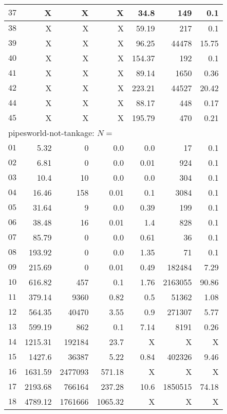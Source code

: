 \begin{longtable}{|c||r|r|r||r|r|r|}
$37$ &  X &  X &  X & 34.8 & 149 & 0.1 \\\hline
$38$ &  X &  X &  X & 59.19 & 217 & 0.1 \\\hline
$39$ &  X &  X &  X & 96.25 & 44478 & 15.75 \\\hline
$40$ &  X &  X &  X & 154.37 & 192 & 0.1 \\\hline
$41$ &  X &  X &  X & 89.14 & 1650 & 0.36 \\\hline
$42$ &  X &  X &  X & 223.21 & 44527 & 20.42 \\\hline
$44$ &  X &  X &  X & 88.17 & 448 & 0.17 \\\hline
$45$ &  X &  X &  X & 195.79 & 470 & 0.21 \\\hline

\multicolumn{7}{|l|}{pipesworld-not-tankage: $N=$}\\\hline
$01$ & 5.32 & 0 & 0.0 & 0.0 & 17 & 0.1 \\\hline
$02$ & 6.81 & 0 & 0.0 & 0.01 & 924 & 0.1 \\\hline
$03$ & 10.4 & 10 & 0.0 & 0.0 & 304 & 0.1 \\\hline
$04$ & 16.46 & 158 & 0.01 & 0.1 & 3084 & 0.1 \\\hline
$05$ & 31.64 & 9 & 0.0 & 0.39 & 199 & 0.1 \\\hline
$06$ & 38.48 & 16 & 0.01 & 1.4 & 828 & 0.1 \\\hline
$07$ & 85.79 & 0 & 0.0 & 0.61 & 36 & 0.1 \\\hline
$08$ & 193.92 & 0 & 0.0 & 1.35 & 71 & 0.1 \\\hline
$09$ & 215.69 & 0 & 0.01 & 0.49 & 182484 & 7.29 \\\hline
$10$ & 616.82 & 457 & 0.1 & 1.76 & 2163055 & 90.86 \\\hline
$11$ & 379.14 & 9360 & 0.82 & 0.5 & 51362 & 1.08 \\\hline
$12$ & 564.35 & 40470 & 3.55 & 0.9 & 271307 & 5.77 \\\hline
$13$ & 599.19 & 862 & 0.1 & 7.14 & 8191 & 0.26 \\\hline
$14$ & 1215.31 & 192184 & 23.7 & X & X & X \\\hline
$15$ & 1427.6 & 36387 & 5.22 & 0.84 & 402326 & 9.46 \\\hline
$16$ & 1631.59 & 2477093 & 571.18 & X & X & X \\\hline
$17$ & 2193.68 & 766164 & 237.28 & 10.6 & 1850515 & 74.18 \\\hline
$18$ & 4789.12 & 1761666 & 1065.32 & X & X & X \\\hline

\end{longtable}
